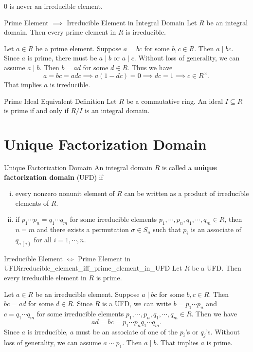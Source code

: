 0 is never an irreducible element.
\begin{proposition}{Prime Element $\implies$ Irreducible Element in Integral Domain}{}
    Let $R$ be an integral domain. Then every prime element in $R$ is irreducible.
\end{proposition}

\begin{prf}
    Let $a\in R$ be a prime element. Suppose $a=bc$ for some $b,c\in R$. Then $a\mid bc$. Since $a$ is prime, there must be $a\mid b$ or $a\mid c$. Without loss of generality, we can assume $a\mid b$. Then $b=ad$ for some $d\in R$. Thus we have $$a=bc=adc\implies a(1-dc)=0\implies dc=1\implies c\in R^\times.$$ That implies $a$ is irreducible.
\end{prf}

\begin{proposition}{Prime Ideal Equivalent Definition}{}
    Let $R$ be a commutative ring. An ideal $I\subseteq R$ is prime if and only if $R/I$ is an integral domain.
\end{proposition}


\section{Unique Factorization Domain}
\begin{definition}{Unique Factorization Domain}{}
    An integral domain $R$ is called a \textbf{unique factorization domain} (UFD) if
    \begin{enumerate}[(i)]
        \item every nonzero nonunit element of $R$ can be written as a product of irreducible elements of $R$.
        \item if $p_1\cdots p_n=q_1\cdots q_m$ for some irreducible elements $p_1,\cdots,p_n,q_1,\cdots,q_m\in R$, then $n=m$ and there exists a permutation $\sigma\in S_n$ such that $p_i$ is an associate of $q_{\sigma(i)}$ for all $i=1,\cdots,n$.
    \end{enumerate}
\end{definition}

\begin{proposition}{Irreducible Element $\iff$ Prime Element in UFD}{irreducible_element_iff_prime_element_in_UFD}
    Let $R$ be a UFD. Then every irreducible element in $R$ is prime.
\end{proposition}

\begin{prf}
    Let $a\in R$ be an irreducible element. Suppose $a\mid bc$ for some $b,c\in R$. Then $bc=ad$ for some $d\in R$. Since $R$ is a UFD, we can write $b=p_1\cdots p_n$ and $c=q_1\cdots q_m$ for some irreducible elements $p_1,\cdots,p_n,q_1,\cdots,q_m\in R$. Then we have $$ad=bc=p_1\cdots p_nq_1\cdots q_m.$$ Since $a$ is irreducible, $a$ must be an associate of one of the $p_i$'s or $q_j$'s. Without loss of generality, we can assume $a\sim p_1$. Then $a\mid b$. That implies $a$ is prime.
\end{prf}

